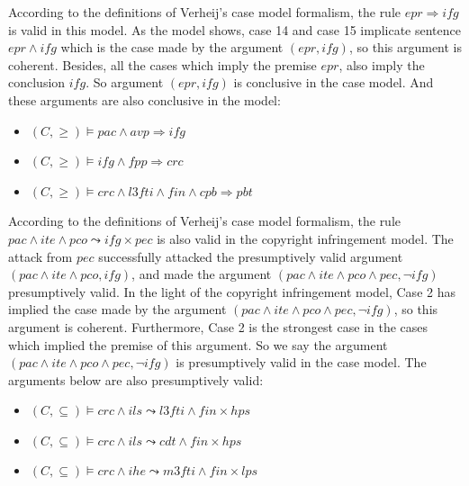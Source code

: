 \documentclass{IOS-Book-Article}
\begin{document}
According to the definitions of Verheij's case model formalism, the rule $epr \Rightarrow ifg$ is valid in this model. As the model shows, case 14 and case 15 implicate sentence $epr \wedge ifg$ which is the case made by the argument $(epr, ifg)$, so this argument is coherent. Besides, all the cases which imply the premise $epr$, also imply the conclusion $ifg$. So argument $(epr, ifg)$ is conclusive in the case model. And these arguments are also conclusive in the model:

\begin{itemize}
\item $(C,  \geq) \models pac \wedge avp \Rightarrow ifg$
\item $(C,  \geq) \models ifg \wedge fpp \Rightarrow crc$
\item $(C,  \geq) \models crc \wedge l3fti \wedge fin \wedge cpb \Rightarrow pbt$
\end{itemize}

According to the definitions of Verheij's case model formalism, the rule $pac \wedge ite \wedge pco \leadsto ifg \times pec$ is also valid in the copyright infringement model. The attack from $pec$ successfully attacked the presumptively valid argument $(pac \wedge ite \wedge pco, ifg)$, and made the argument $(pac \wedge ite \wedge pco \wedge pec, \neg ifg)$ presumptively valid. In the light of the copyright infringement model, Case 2 has implied the case made by the argument $(pac \wedge ite \wedge pco \wedge pec, \neg ifg)$, so this argument is coherent. Furthermore, Case 2 is the strongest case in the cases which implied the premise of this argument. So we say the argument $(pac \wedge ite \wedge pco \wedge pec, \neg ifg)$ is presumptively valid in the case model. The arguments below are also presumptively valid:

\begin{itemize}
\item $(C,  \subseteq) \models crc \wedge ils \leadsto l3fti \wedge fin \times hps$
\item $(C,  \subseteq) \models crc \wedge ils \leadsto cdt \wedge fin \times hps$
\item $(C,  \subseteq) \models crc \wedge ihe \leadsto m3fti \wedge fin \times lps$
\end{itemize}
\end{document}
